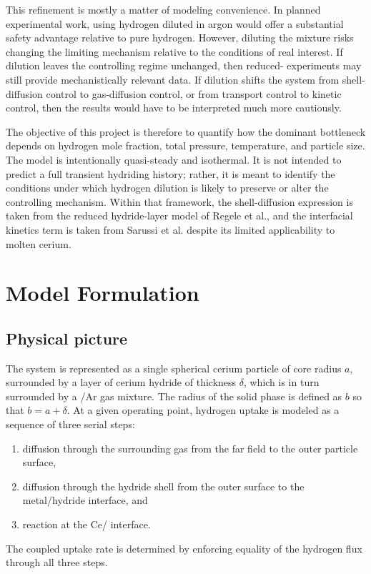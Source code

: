 \documentclass[11pt]{article}
\begin{document}
This refinement is mostly a matter of modeling convenience. In planned
experimental work, using hydrogen diluted in argon would offer a substantial
safety advantage relative to pure hydrogen. However, diluting the mixture risks
changing the limiting mechanism relative to the conditions of real interest. If
dilution leaves the controlling regime unchanged, then reduced-
experiments may still provide mechanistically relevant data. If dilution shifts
the system from shell-diffusion control to gas-diffusion control, or from
transport control to kinetic control, then the results would have to be
interpreted much more cautiously.

The objective of this project is therefore to quantify how the dominant
bottleneck depends on hydrogen mole fraction, total pressure, temperature, and
particle size. The model is intentionally quasi-steady and isothermal. It is
not intended to predict a full transient hydriding history; rather, it is meant
to identify the conditions under which hydrogen dilution is likely to preserve
or alter the controlling mechanism. Within that framework, the shell-diffusion
expression is taken from the reduced hydride-layer model of Regele
et al.\cite{Regele2023}, and the interfacial kinetics term is taken from
Sarussi et al.\cite{Sarussi1993} despite its limited applicability to molten
cerium.

\section{Model Formulation}

\subsection{Physical picture}

The system is represented as a single spherical cerium particle of core radius
$a$, surrounded by a layer of cerium hydride of thickness $\delta$, which is in
turn surrounded by a /Ar gas mixture. The radius of the solid phase is
defined as $b$ so that $b = a + \delta$. At a given operating point, hydrogen
uptake is modeled as a sequence of three serial steps:
\begin{enumerate}
  \item diffusion through the surrounding gas from the far field to the outer
  particle surface,
  \item diffusion through the hydride shell from the outer surface to the
  metal/hydride interface, and
  \item reaction at the Ce/ interface.
\end{enumerate}
The coupled uptake rate is determined by enforcing equality of the hydrogen flux
through all three steps.
\end{document}
